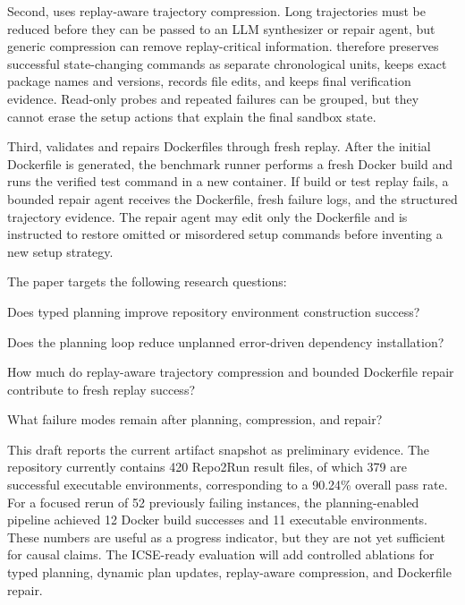 Second, \tool uses replay-aware trajectory compression.
Long trajectories must be reduced before they can be passed to an LLM synthesizer or repair agent, but generic compression can remove replay-critical information.
\tool therefore preserves successful state-changing commands as separate chronological units, keeps exact package names and versions, records file edits, and keeps final verification evidence.
Read-only probes and repeated failures can be grouped, but they cannot erase the setup actions that explain the final sandbox state.

Third, \tool validates and repairs Dockerfiles through fresh replay.
After the initial Dockerfile is generated, the benchmark runner performs a fresh Docker build and runs the verified test command in a new container.
If build or test replay fails, a bounded repair agent receives the Dockerfile, fresh failure logs, and the structured trajectory evidence.
The repair agent may edit only the Dockerfile and is instructed to restore omitted or misordered setup commands before inventing a new setup strategy.

The paper targets the following research questions:

\begin{description}[labelwidth=3em,leftmargin=4em,align=left]
  \item[RQ1:] Does typed planning improve repository environment construction success?
  \item[RQ2:] Does the planning loop reduce unplanned error-driven dependency installation?
  \item[RQ3:] How much do replay-aware trajectory compression and bounded Dockerfile repair contribute to fresh replay success?
  \item[RQ4:] What failure modes remain after planning, compression, and repair?
\end{description}

This draft reports the current artifact snapshot as preliminary evidence.
The repository currently contains 420 Repo2Run result files, of which 379 are successful executable environments, corresponding to a 90.24\% overall pass rate.
For a focused rerun of 52 previously failing instances, the planning-enabled pipeline achieved 12 Docker build successes and 11 executable environments.
These numbers are useful as a progress indicator, but they are not yet sufficient for causal claims.
The ICSE-ready evaluation will add controlled ablations for typed planning, dynamic plan updates, replay-aware compression, and Dockerfile repair.

